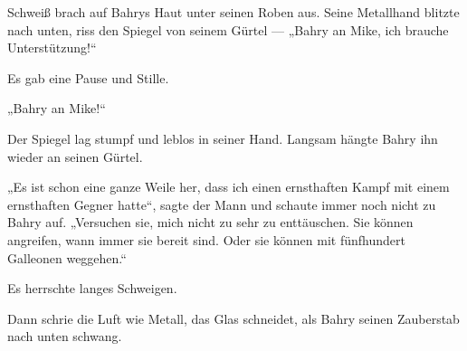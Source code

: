 Schweiß brach auf Bahrys Haut unter seinen Roben aus. Seine Metallhand blitzte nach unten, riss den Spiegel von seinem Gürtel —
„Bahry an Mike, ich brauche Unterstützung!“

Es gab eine Pause und Stille.

„Bahry an Mike!“

Der Spiegel lag stumpf und leblos in seiner Hand. Langsam hängte Bahry ihn wieder an seinen Gürtel.

„Es ist schon eine ganze Weile her, dass ich einen ernsthaften Kampf mit einem ernsthaften Gegner hatte“, sagte der Mann und schaute immer noch nicht zu Bahry auf.
„Versuchen sie, mich nicht zu sehr zu enttäuschen. Sie können angreifen, wann immer sie bereit sind. Oder sie können mit fünfhundert Galleonen weggehen.“

Es herrschte langes Schweigen.

Dann schrie die Luft wie Metall, das Glas schneidet, als Bahry seinen Zauberstab nach unten schwang.

\later

